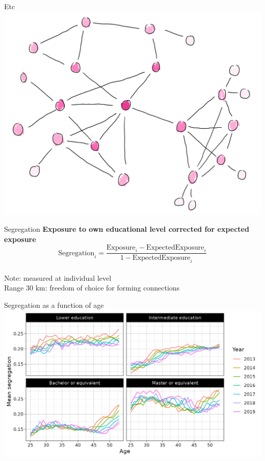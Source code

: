 \documentclass[aspectratio=169]{beamer}
\begin{document}
\begin{frame}{Etc}
\includegraphics[width=0.52\paperwidth]{figures/random_walk_03.png}
\end{frame}

\begin{frame}{Segregation}
  \textbf{Exposure to own educational level corrected for expected exposure}\\[3em]

  \begin{equation}
    \mathrm{Segregation}_i = \frac{\mathrm{Exposure}_i - \mathrm{ExpectedExposure}_i}{
      1 - \mathrm{ExpectedExposure}_i} \nonumber
  \end{equation}\\[2em]

  Note: measured at individual level\\[0.5em]
  Range 30 km: freedom of choice for forming connections
\end{frame}

\begin{frame}{Segregation as a function of age}
\includegraphics[width=0.79\paperwidth]{figures/segregatie_naar_leeftijd.png}
\end{frame}
\end{document}
